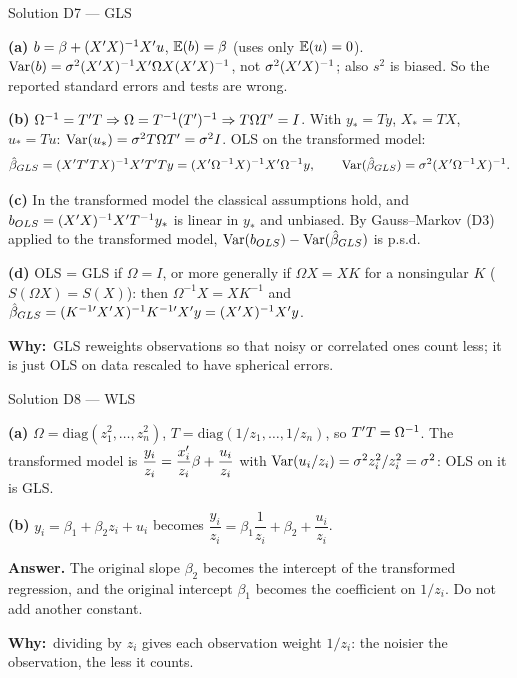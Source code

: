 \documentclass[11pt]{article}
\newcommand{\step}[1]{\par\smallskip\noindent\textbf{\textcolor{qnavy}{#1}}\quad\ignorespaces}
\newcommand{\Why}{\textbf{\textcolor{whyline}{Why:}}\ }
\newcommand{\Ans}[1]{\par\smallskip\noindent\colorbox{qlight}{\parbox{\dimexpr\linewidth-2\fboxsep}{\textbf{Answer.} #1}}\par}
\begin{document}
\begin{solbox}{Solution D7 --- GLS}
\step{(a)} $b = \beta + (X^{\prime} X)^{-1}X^{\prime} u$, $\mathbb{E}(b) = \beta$ (uses only $\mathbb{E}(u) = 0$).
$\operatorname{Var}(b) = \sigma^{2}(X^{\prime} X)^{-1}X^{\prime}\Omega X(X^{\prime} X)^{-1}$, not $\sigma^{2}(X^{\prime} X)^{-1}$; also $s^{2}$ is biased.
So the reported standard errors and tests are wrong.
\step{(b)} $\Omega^{-1} = T^{\prime} T \Rightarrow \Omega = T^{-1}(T^{\prime})^{-1} \Rightarrow T\Omega T^{\prime} = I$. With
$y_{*} = Ty$, $X_{*} = TX$, $u_{*} = Tu$: $\operatorname{Var}(u_{*}) = \sigma^{2}T\Omega T^{\prime} = \sigma^{2}I$. OLS on the
transformed model:
\[
  \hat\beta_{GLS} = (X^{\prime} T^{\prime} TX)^{-1}X^{\prime} T^{\prime} Ty = (X^{\prime}\Omega^{-1}X)^{-1}X^{\prime}\Omega^{-1}y,
  \qquad \operatorname{Var}(\hat\beta_{GLS}) = \sigma^{2}(X^{\prime}\Omega^{-1}X)^{-1}.
\]
\step{(c)} In the transformed model the classical assumptions hold, and
$b_{OLS} = (X^{\prime} X)^{-1}X^{\prime} T^{-1}y_{*}$ is linear in $y_{*}$ and unbiased. By Gauss--Markov (D3)
applied to the transformed model, $\operatorname{Var}(b_{OLS}) - \operatorname{Var}(\hat\beta_{GLS})$ is p.s.d.
\step{(d)} OLS = GLS if $\Omega = I$, or more generally if $\Omega X = XK$ for a nonsingular $K$
($S(\Omega X) = S(X)$): then $\Omega^{-1}X = XK^{-1}$ and
$\hat\beta_{GLS} = (K^{-1\prime}X^{\prime} X)^{-1}K^{-1\prime}X^{\prime} y = (X^{\prime} X)^{-1}X^{\prime} y$.
\begin{why}\Why GLS reweights observations so that noisy or correlated ones count less;
it is just OLS on data rescaled to have spherical errors.\end{why}
\end{solbox}

\begin{solbox}{Solution D8 --- WLS}
\step{(a)} $\Omega = \mathrm{diag}(z_{1}^{2},\dots,z_{n}^{2})$, $T = \mathrm{diag}(1/z_{1},\dots,1/z_{n})$, so
$T^{\prime} T = \Omega^{-1}$. The transformed model is
$\dfrac{y_{i}}{z_{i}} = \dfrac{x_{i}^{\prime}}{z_{i}}\beta + \dfrac{u_{i}}{z_{i}}$ with
$\operatorname{Var}(u_{i}/z_{i}) = \sigma^{2}z_{i}^{2}/z_{i}^{2} = \sigma^{2}$: OLS on it is GLS.
\step{(b)} $y_{i} = \beta_{1} + \beta_{2}z_{i} + u_{i}$ becomes
$\dfrac{y_{i}}{z_{i}} = \beta_{1}\dfrac{1}{z_{i}} + \beta_{2} + \dfrac{u_{i}}{z_{i}}$.
\Ans{The original slope $\beta_{2}$ becomes the intercept of the transformed regression, and
the original intercept $\beta_{1}$ becomes the coefficient on $1/z_{i}$. Do not add another constant.}
\begin{why}\Why dividing by $z_{i}$ gives each observation weight $1/z_{i}$: the noisier the
observation, the less it counts.\end{why}
\end{solbox}
\end{document}
